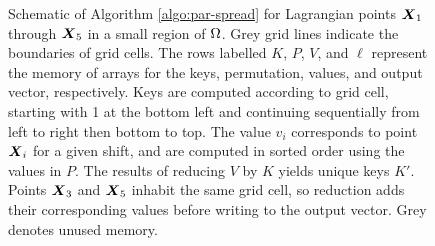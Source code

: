 \begin{figure}[tb]
\begin{center}

    \end{center}

    \caption{%
        Schematic of Algorithm \ref{algo:par-spread} for Lagrangian points
        $\boldsymbol{X}_1$ through $\boldsymbol{X}_5$ in a small region of $\Omega$. Grey grid lines
        indicate the boundaries of grid cells. The rows labelled $K$, $P$, $V$,
        and $\ell$ represent the memory of arrays for the keys, permutation,
        values, and output vector, respectively. Keys are computed according to
        grid cell, starting with 1 at the bottom left and continuing
        sequentially from left to right then bottom to top. The value $v_i$
        corresponds to point $\boldsymbol{X}_i$ for a given shift, and are computed in
        sorted order using the values in $P$. The results of reducing $V$ by
        $K$ yields unique keys $K'$. Points $\boldsymbol{X}_3$ and $\boldsymbol{X}_5$ inhabit the same
        grid cell, so reduction adds their corresponding values before writing
        to the output vector. Grey denotes unused memory.
    }
    \label{fig:algo}
\end{figure}
